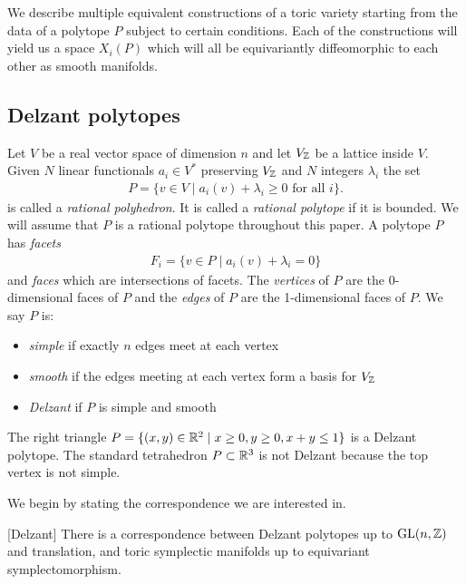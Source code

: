 We describe multiple equivalent constructions of a toric variety starting from the data
of a polytope $P$ subject to certain conditions. Each of 
the constructions will yield us a space $X_i(P)$ which will all be 
equivariantly diffeomorphic to each other as smooth manifolds. 





\subsection{Delzant polytopes}
Let $V$ be a real vector space of dimension $n$ and let $V_{\mathbb{Z}}$
be a lattice inside $V$. Given 
$N$ linear functionals $a_i \in V^*$ preserving $V_{\mathbb{Z}}$ and $N$ integers $\lambda_i$
the set \begin{align*}
P = \{ v \in V \mid a_i(v) + \lambda_i \geq 0 \text{ for all } i \}.
\end{align*} is called a \emph{rational polyhedron}. It is called 
a \emph{rational polytope} if it is bounded. We will assume that $P$ is a
rational polytope throughout this paper. A polytope $P$ has \emph{facets} \begin{align*}
F_i = \{ v \in P \mid a_i(v) + \lambda_i = 0 \}
\end{align*} and \emph{faces} which are intersections of facets. 
The \emph{vertices} of $P$ are the 0-dimensional faces of $P$ and 
the \emph{edges} of $P$ are the 1-dimensional faces of $P$.
We say $P$ is: \begin{itemize}
    \item \emph{simple} if exactly $n$ edges meet at each vertex
    \item \emph{smooth} if the edges meeting at each vertex form a basis for $V_{\mathbb{Z}}$
    \item \emph{Delzant} if $P$ is simple and smooth
\end{itemize}

\begin{example}
    The right triangle $P = \{ (x,y) \in \mathbb{R}^2 \mid x \geq 0, y \geq 0, x + y \leq 1 \}$ is a 
    Delzant polytope. The standard tetrahedron $P\subset\mathbb{R}^3$ is not Delzant because the
    top vertex is not simple.
\end{example}
We begin by stating the correspondence we are interested in.
\begin{theorem}\label{thm:delzant}
    [Delzant] There is a correspondence between Delzant polytopes up to $\operatorname{GL}(n,\mathbb{Z})$ 
    and translation, and toric symplectic manifolds up to equivariant symplectomorphism.
\end{theorem}

